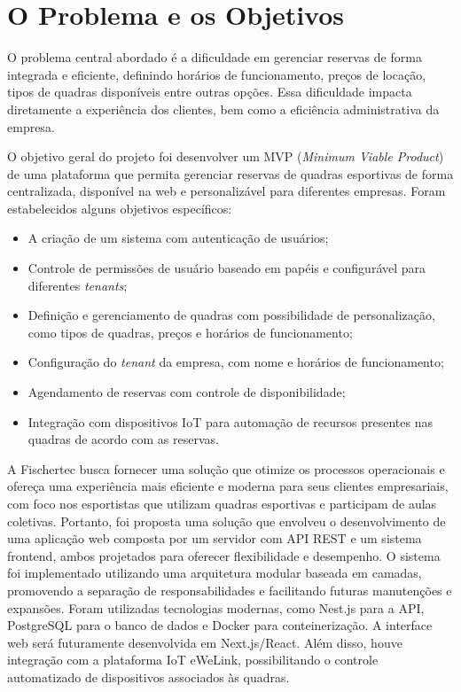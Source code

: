 \section{O Problema e os Objetivos}

O problema central abordado é a dificuldade em gerenciar reservas de forma integrada e eficiente, definindo horários de funcionamento, preços de locação, tipos de quadras disponíveis entre outras opções. Essa dificuldade impacta diretamente a experiência dos clientes, bem como a eficiência administrativa da empresa.

O objetivo geral do projeto foi desenvolver um MVP (\textit{Minimum Viable Product}) de uma plataforma que permita gerenciar reservas de quadras esportivas de forma centralizada, disponível na web e personalizável para diferentes empresas. Foram estabelecidos alguns objetivos específicos:

\begin{itemize}
    \item A criação de um sistema com autenticação de usuários;
    \item Controle de permissões de usuário baseado em papéis e configurável para diferentes \textit{tenants};
    \item Definição e gerenciamento de quadras com possibilidade de personalização, como tipos de quadras, preços e horários de funcionamento;
    \item Configuração do \textit{tenant} da empresa, com nome e horários de funcionamento;
    \item Agendamento de reservas com controle de disponibilidade;
    \item Integração com dispositivos IoT para automação de recursos presentes nas quadras de acordo com as reservas.
\end{itemize}

A Fischertec busca fornecer uma solução que otimize os processos operacionais e ofereça uma experiência mais eficiente e moderna para seus clientes empresariais, com foco nos esportistas que utilizam quadras esportivas e participam de aulas coletivas. Portanto, foi proposta uma solução que envolveu o desenvolvimento de uma aplicação web composta por um servidor com API REST e um sistema frontend, ambos projetados para oferecer flexibilidade e desempenho. O sistema foi implementado utilizando uma arquitetura modular baseada em camadas, promovendo a separação de responsabilidades e facilitando futuras manutenções e expansões. Foram utilizadas tecnologias modernas, como Nest.js para a API, PostgreSQL para o banco de dados e Docker para conteinerização. A interface web será futuramente desenvolvida em Next.js/React. Além disso, houve integração com a plataforma IoT eWeLink, possibilitando o controle automatizado de dispositivos associados às quadras.

